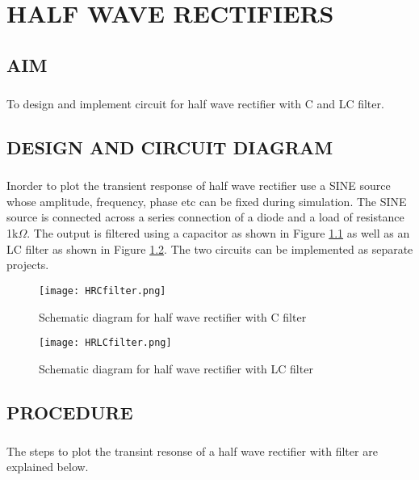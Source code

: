 \chapter{HALF WAVE RECTIFIERS}

\section*{AIM}
\paragraph{}To design and implement circuit for half wave rectifier with C and LC filter.

\section*{DESIGN AND CIRCUIT DIAGRAM}
\paragraph{}

Inorder to plot the transient response of half wave rectifier use a SINE source whose amplitude, frequency, phase etc can be fixed during simulation. The SINE source is connected across a series connection of a diode and a load of resistance 1k$\Omega$. The output is filtered using a capacitor as shown in Figure \ref{HRCfilter}	as well as an LC filter as shown in Figure \ref{HRLCfilter}. The two circuits can be implemented as separate projects.

\begin{figure}[h]
\centering
\texttt{[image: HRCfilter.png]}
\caption{Schematic diagram for half wave rectifier with C filter}
\label{HRCfilter}
\end{figure}

\begin{figure}[h]
\centering
\texttt{[image: HRLCfilter.png]}
\caption{Schematic diagram for half wave rectifier with LC filter}
\label{HRLCfilter}
\end{figure}


\section*{PROCEDURE}

\paragraph{}The steps to plot the transint resonse of a half wave rectifier with filter are explained below. 
